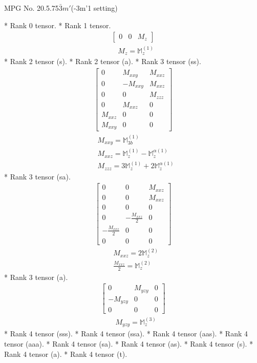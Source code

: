 \documentclass[fleqn,8pt,landscape]{jsarticle}
\begin{document}
\setcounter{MaxMatrixCols}{32}

\renewcommand{\tablename}{Table~}
\renewcommand{\figurename}{Figure~}
\begin{center}
\LARGE
MPG No. 20.5.75\quad$\bar{3}m'$\quad(-3m'1 setting)
\end{center}
* Rank 0 tensor.
* Rank 1 tensor.
\begin{align*}
\begin{bmatrix} 0 & 0 & M_{z} \end{bmatrix}
\end{align*}
\begin{align*}
& M_{z} = \mathbb{M}_{z}^{(1)}
\end{align*}
* Rank 2 tensor (s).
* Rank 2 tensor (a).
* Rank 3 tensor (ss).
\begin{align*}
\begin{bmatrix} 0 & M_{xxy} & M_{xxz} \\ 0 & - M_{xxy} & M_{xxz} \\ 0 & 0 & M_{zzz} \\ 0 & M_{xxz} & 0 \\ M_{xxz} & 0 & 0 \\ M_{xxy} & 0 & 0 \end{bmatrix}
\end{align*}
\begin{align*}
& M_{xxy} = \mathbb{M}_{3b}^{(1)} \\
& M_{xxz} = \mathbb{M}_{z}^{(1)} - \mathbb{M}_{z}^{\alpha(1)} \\
& M_{zzz} = 3 \mathbb{M}_{z}^{(1)} + 2 \mathbb{M}_{z}^{\alpha(1)}
\end{align*}
* Rank 3 tensor (sa).
\begin{align*}
\begin{bmatrix} 0 & 0 & M_{xxz} \\ 0 & 0 & M_{xxz} \\ 0 & 0 & 0 \\ 0 & - \frac{M_{xxz}}{2} & 0 \\ - \frac{M_{xxz}}{2} & 0 & 0 \\ 0 & 0 & 0 \end{bmatrix}
\end{align*}
\begin{align*}
& M_{xxz} = 2 \mathbb{M}_{z}^{(2)} \\
& \frac{M_{xxz}}{2} = \mathbb{M}_{z}^{(2)}
\end{align*}
* Rank 3 tensor (a).
\begin{align*}
\begin{bmatrix} 0 & M_{yzy} & 0 \\ - M_{yzy} & 0 & 0 \\ 0 & 0 & 0 \end{bmatrix}
\end{align*}
\begin{align*}
& M_{yzy} = \mathbb{M}_{z}^{(3)}
\end{align*}
* Rank 4 tensor (sss).
* Rank 4 tensor (ssa).
* Rank 4 tensor (aas).
* Rank 4 tensor (aaa).
* Rank 4 tensor (sa).
* Rank 4 tensor (as).
* Rank 4 tensor (s).
* Rank 4 tensor (a).
* Rank 4 tensor (t).
\end{document}
